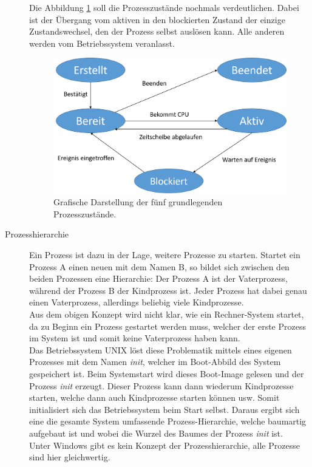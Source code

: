 \begin{description}
						Die Abbildung \ref{fig:Prozesszustaende} soll die Prozesszustände nochmals verdeutlichen. Dabei ist der Übergang vom aktiven in den blockierten Zustand der einzige Zustandswechsel, den der Prozess selbst auslösen kann. Alle anderen werden vom Betriebssystem veranlasst. \cite{ModerneBetriebssysteme}
						
						\begin{figure}
							\centering	
							\includegraphics[width=11cm]{Abbildungen/Prozesszustaende.png}
							\caption{Grafische Darstellung der fünf grundlegenden Prozesszustände.}
							\label{fig:Prozesszustaende}
						\end{figure}
		
					\item[Prozesshierarchie]
						\label{Prozesshierarchie}
						
						Ein Prozess ist dazu in der Lage, weitere Prozesse zu starten. Startet ein Prozess A einen neuen mit dem Namen B, so bildet sich zwischen den beiden Prozessen eine Hierarchie: Der Prozess A ist der Vaterprozess, während der Prozess B der Kindprozess ist. Jeder Prozess hat dabei genau einen Vaterprozess, allerdings beliebig viele Kindprozesse.\\
						Aus dem obigen Konzept wird nicht klar, wie ein Rechner-System startet, da zu Beginn ein Prozess gestartet werden muss, welcher der erste Prozess im System ist und somit keine Vaterprozess haben kann.\\
						Das Betriebssystem UNIX löst diese Problematik mittels eines eigenen Prozesses mit dem Namen \textit{init}, welcher im Boot-Abbild des System gespeichert ist. Beim Systemstart wird dieses Boot-Image gelesen und der Prozess \textit{init} erzeugt. Dieser Prozess kann dann wiederum Kindprozesse starten, welche dann auch Kindprozesse starten können usw. Somit initialisiert sich das Betriebssystem beim Start selbst. Daraus ergibt sich eine die gesamte System umfassende Prozess-Hierarchie, welche baumartig aufgebaut ist und wobei die Wurzel des Baumes der Prozess \textit{init} ist.\\
						Unter Windows gibt es kein Konzept der Prozesshierarchie, alle Prozesse sind hier gleichwertig. \cite{ModerneBetriebssysteme}
		

\end{description}
